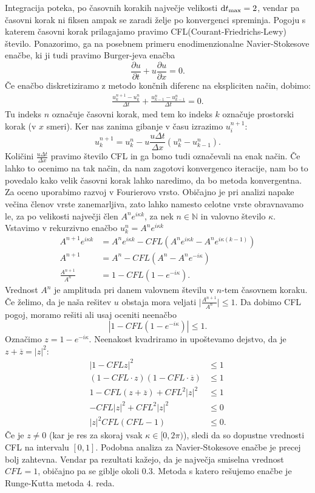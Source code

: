 \documentclass[mat2, tisk]{fmfdelo}
\begin{document}
Integracija poteka, po časovnih korakih največje velikosti $\dif t_{\text{max}} = 2$, vendar pa časovni 
korak ni fiksen ampak se zaradi želje po konvergenci spreminja. Pogoju s
katerem časovni korak prilagajamo pravimo 
CFL(Courant-Friedrichs-Lewy) število. Ponazorimo, ga na posebnem 
primeru enodimenzionalne Navier-Stokesove enačbe, ki ji tudi pravimo 
Burger-jeva enačba
$$
\frac{\partial u}{\partial t} + u \frac{\partial u}{\partial x} = 0.
$$
Če enačbo diskretiziramo z metodo končnih diferenc na ekspliciten način, dobimo:
\begin{align*}
\frac{u_k^{n+1} - u_k^{n}}{\Delta t} + \frac{u_{k-1}^{n} - u_{k-1}^{n}}{\Delta t} = 0.
\end{align*}
Tu indeks $n$ označuje časovni korak, med tem ko indeks $k$ označuje prostorski korak (v $x$ smeri).
Ker nas zanima gibanje v času izrazimo $u_i^{n+1}$:
$$
u_k^{n+1} = u_k^{n} - u\frac{u \Delta t}{\Delta x}(u_{k}^{n} - u_{k-1}^{n}).
$$
Količini $\frac{u \Delta t}{\Delta x}$ pravimo število CFL in ga bomo 
tudi označevali na enak način. Če lahko to ocenimo na tak način, da
nam zagotovi konvergenco iteracije, nam bo to povedalo kako velik 
časovni korak lahko naredimo, da bo metoda konvergentna.
Za oceno uporabimo razvoj v Fourierovo vrsto. Običajno je pri analizi
 napake večina členov vrste zanemarljiva, zato lahko namesto celotne 
 vrste obravnavamo le, za po velikosti največji člen 
 $A^n e^{i\kappa k}$, za nek $n\in \mathbb{N}$ in valovno število 
 $\kappa$. Vstavimo v rekurzivno enačbo $u_k^n = A^n e^{i\kappa k}$
\begin{align*}
A^{n+1} e^{i\kappa k} &= A^n e^{i\kappa k} - CFL (A^n e^{i\kappa k} - A^n e^{i\kappa (k-1)}) \\
A^{n+1} &= A^n - CFL (A^n - A^n e^{-i\kappa}) \\ 
\frac{A^{n+1}}{A^n} &= 1 - CFL(1 - e^{-i\kappa}).
\end{align*}
Vrednost $A^n$ je amplituda pri danem valovnem številu v $n$-tem časovnem koraku. Če želimo, da je naša rešitev $u$ obstaja mora veljati $\Big|\frac{A^{n+1}}{A^n}\Big| \leq 1$. Da dobimo CFL pogoj, moramo rešiti ali usaj oceniti neenačbo 
$$
|1 - CFL(1 - e^{-i\kappa})| \leq 1. 
$$
Označimo $z = 1 - e^{-i\kappa}$. Neenakost kvadriramo in upoštevamo dejstvo, da je 
$z+\overline{z} = |z|^2$:
\begin{align*}
  |1 - CFL z|^2 &\leq 1 \\
  (1 - CFL\cdot z)(1- CFL\cdot \overline{z}) &\leq 1 \\
  1 - CFL(z + \overline{z}) + CFL^2 |z|^2 &\leq 1 \\
  - CFL|z|^2 + CFL^2 |z|^2 &\leq 0 \\
  |z|^2 CFL(CFL - 1)&\leq 0.
\end{align*}
Če je $z \neq 0$ (kar je res za skoraj vsak $\kappa \in [0, 2\pi)$), sledi da 
so dopustne vrednosti CFL na intervalu $[0, 1]$. Podobna analiza 
za Navier-Stokesove enačbe je precej bolj zahtevna. Vendar pa rezultati
kažejo, da je največja smiselna vrednost $CFL = 1$, običajno pa se giblje okoli $0.3$.
Metoda s katero rešujemo enačbe je Runge-Kutta metoda $4$. reda.
\end{document}
